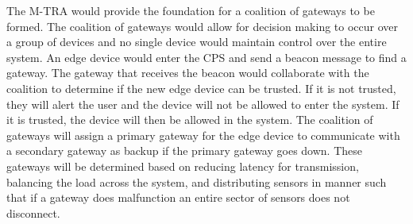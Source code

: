 \documentclass[../main.tex]{subfiles}
\begin{document}
The M-TRA would provide the foundation for a coalition of gateways to be formed. The coalition of gateways would allow for decision making to occur over a group of devices and no single device would maintain control over the entire system. An edge device would enter the CPS and send a beacon message to find a gateway. The gateway that receives the beacon would collaborate with the coalition to determine if the new edge device can be trusted. If it is not trusted, they will alert the user and the device will not be allowed to enter the system. If it is trusted, the device will then be allowed in the system. The coalition of gateways will assign a primary gateway for the edge device to communicate with a secondary gateway as backup if the primary gateway goes down. These gateways will be determined based on reducing latency for transmission, balancing the load across the system, and distributing sensors in manner such that if a gateway does malfunction an entire sector of sensors does not disconnect. 
\end{document}
